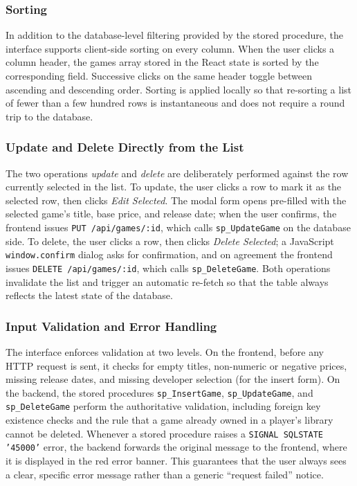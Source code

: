 \subsubsection{Sorting}\label{subsec:sort-detail}

In addition to the database-level filtering provided by the stored procedure, the interface supports client-side sorting on every column. When the user clicks a column header, the games array stored in the React state is sorted by the corresponding field. Successive clicks on the same header toggle between ascending and descending order. Sorting is applied locally so that re-sorting a list of fewer than a few hundred rows is instantaneous and does not require a round trip to the database.

\subsubsection{Update and Delete Directly from the List}

The two operations \emph{update} and \emph{delete} are deliberately performed against the row currently selected in the list. To update, the user clicks a row to mark it as the selected row, then clicks \textit{Edit Selected}. The modal form opens pre-filled with the selected game's title, base price, and release date; when the user confirms, the frontend issues \texttt{PUT /api/games/:id}, which calls \texttt{sp\_UpdateGame} on the database side. To delete, the user clicks a row, then clicks \textit{Delete Selected}; a JavaScript \texttt{window.confirm} dialog asks for confirmation, and on agreement the frontend issues \texttt{DELETE /api/games/:id}, which calls \texttt{sp\_DeleteGame}. Both operations invalidate the list and trigger an automatic re-fetch so that the table always reflects the latest state of the database.

\subsubsection{Input Validation and Error Handling}

The interface enforces validation at two levels. On the frontend, before any HTTP request is sent, it checks for empty titles, non-numeric or negative prices, missing release dates, and missing developer selection (for the insert form). On the backend, the stored procedures \texttt{sp\_InsertGame}, \texttt{sp\_UpdateGame}, and \texttt{sp\_DeleteGame} perform the authoritative validation, including foreign key existence checks and the rule that a game already owned in a player's library cannot be deleted. Whenever a stored procedure raises a \texttt{SIGNAL SQLSTATE '45000'} error, the backend forwards the original message to the frontend, where it is displayed in the red error banner. This guarantees that the user always sees a clear, specific error message rather than a generic ``request failed'' notice.

